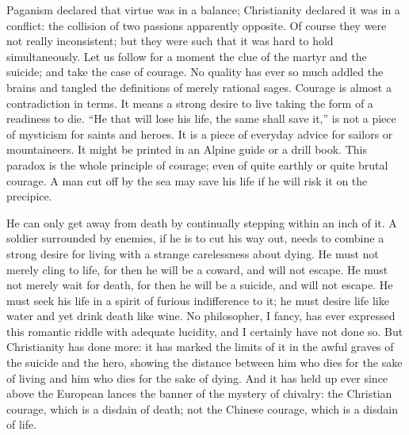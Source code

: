 Paganism declared that virtue was in a balance; Christianity declared it was in a conflict: the collision of two passions apparently opposite. Of course they were not really inconsistent; but they were such that it was hard to hold simultaneously. Let us follow for a moment the clue of the martyr and the suicide; and take the case of courage. No quality has ever so much addled the brains and tangled the definitions of merely rational sages. Courage is almost a contradiction in terms. It means a strong desire to live taking the form of a readiness to die. “He that will lose his life, the same shall save it,” is not a piece of mysticism for saints and heroes. It is a piece of everyday advice for sailors or mountaineers. It might be printed in an Alpine guide or a drill book. This paradox is the whole principle of courage; even of quite earthly or quite brutal courage. A man cut off by the sea may save his life if he will risk it on the precipice.

He can only get away from death by continually stepping within an inch of it. A soldier surrounded by enemies, if he is to cut his way out, needs to combine a strong desire for living with a strange carelessness about dying. He must not merely cling to life, for then he will be a coward, and will not escape. He must not merely wait for death, for then he will be a suicide, and will not escape. He must seek his life in a spirit of furious indifference to it; he must desire life like water and yet drink death like wine. No philosopher, I fancy, has ever expressed this romantic riddle with adequate lucidity, and I certainly have not done so. But Christianity has done more: it has marked the limits of it in the awful graves of the suicide and the hero, showing the distance between him who dies for the sake of living and him who dies for the sake of dying. And it has held up ever since above the European lances the banner of the mystery of chivalry: the Christian courage, which is a disdain of death; not the Chinese courage, which is a disdain of life.

